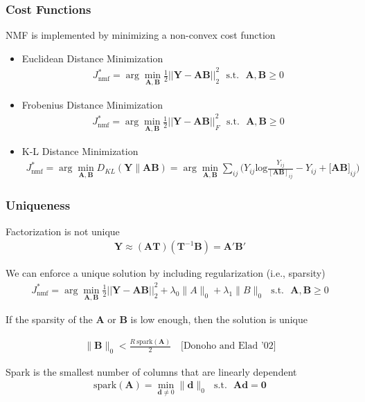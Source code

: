 \documentclass{beamer}
\begin{document}
\begin{frame}
\frametitle{Cost Functions}
NMF is implemented by minimizing a non-convex cost function
\begin{itemize}
\item Euclidean Distance Minimization
	\begin{align*} 
		J_{\text{nmf}}^* = \arg\min_{\mathbf{A,B}} {\frac{1}{2}||\mathbf{Y} - \mathbf{A} \mathbf{B}||}_{2}^2  \ \ \    \text{s.t.} \ \ \ \mathbf{A}, \mathbf{B}  \ge 0
	\end{align*}
\item Frobenius  Distance Minimization
	\begin{align*} 
		J_{\text{nmf}}^* = \arg\min_{\mathbf{A,B}} {\frac{1}{2}||\mathbf{Y} - \mathbf{A} \mathbf{B}||}_{F}^2  \ \ \    \text{s.t.} \ \ \ \mathbf{A}, \mathbf{B}  \ge 0
	\end{align*}
\item K-L Distance Minimization
	\begin{align*} 
		J_{\text{nmf}}^* = \arg\min_{\mathbf{A,B}} { D_{KL}(\mathbf{Y}\|\mathbf{A}\mathbf{B}) } = \arg\min_{\mathbf{A,B}} { \sum_{ij}(Y_{ij}\text{log}{\frac{Y_{ij}}{[\mathbf{A}\mathbf{B}]_{ij}} - Y_{ij} + {[\mathbf{A}\mathbf{B}}]_{ij})}}
	\end{align*}
\end{itemize}

\end{frame}

\begin{frame}
\frametitle{Uniqueness}
Factorization is not unique
\begin{align*}
\mathbf{Y} \approx (\mathbf{A} \mathbf{T}) (\mathbf{T}^{-1} \mathbf{B}) = \mathbf{A}' \mathbf{B}'
\end{align*}

We can enforce a unique solution by including regularization (i.e., sparsity)
	\begin{align*} 
		J_{\text{nmf}}^* = \arg\min_{\mathbf{A,B}} {\frac{1}{2}||\mathbf{Y} - \mathbf{A} \mathbf{B}||}_{2}^2 + \lambda_0 \|A\|_0 + \lambda_1 \|B\|_0 \ \ \    \text{s.t.} \ \ \ \mathbf{A}, \mathbf{B}  \ge 0
	\end{align*}

If the sparsity of the \(\mathbf{A}\) or \(\mathbf{B}\) is low enough, then the solution is unique

\begin{align*}
\|\mathbf{B}\|_0 < \frac{R\ \text{spark}(\mathbf{A})}{2} \ \ \ \text{ [Donoho and Elad '02]}
\end{align*}

Spark is the smallest number of columns that are linearly dependent
\begin{align*}
\text{spark}(\mathbf{A}) = \min_{\mathbf{d} \ne 0}\|\mathbf{d}\|_0  \ \ \ \text{s.t.} \ \ \ \mathbf{A}\mathbf{d} = \mathbf{0}
\end{align*}

\end{frame}
\end{document}
